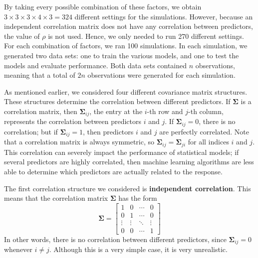 \documentclass{article}
\begin{document}
By taking every possible combination of these factors, we obtain $3\times 3\times 3\times 4\times 3 = 324$ different settings for the simulations. However, because an independent correlation matrix does not have any correlation between predictors, the value of $\rho$ is not used. Hence, we only needed to run 270 different settings. For each combination of factors, we ran 100 simulations. In each simulation, we generated two data sets: one to train the various models, and one to test the models and evaluate performance. Both data sets contained $n$ observations, meaning that a total of $2n$ observations were generated for each simulation.

As mentioned earlier, we considered four different covariance matrix structures. These structures determine the correlation between different predictors. If $\mathbf{\Sigma}$ is a correlation matrix, then $\mathbf{\Sigma}_{ij}$, the entry at the $i$-th row and $j$-th column, represents the correlation between predictors $i$ and $j$. If $\mathbf{\Sigma}_{ij}=0$, there is no correlation; but if $\mathbf{\Sigma}_{ij}=1$, then predictors $i$ and $j$ are perfectly correlated. Note that a correlation matrix is always symmetric, so $\mathbf{\Sigma}_{ij} = \mathbf{\Sigma}_{ji}$ for all indices $i$ and $j$. This correlation can severely impact the performance of statistical models; if several predictors are highly correlated, then machine learning algorithms are less able to determine which predictors are actually related to the response.

The first correlation structure we considered is \textbf{independent correlation}. This means that the correlation matrix $\mathbf{\Sigma}$ has the form
\begin{equation}
	\mathbf{\Sigma} = \begin{bmatrix}
		1 & 0 & \cdots & 0 \\
		0 & 1 & \cdots & 0 \\
		\vdots & \vdots & \ddots & \vdots \\
		0 & 0 & \cdots & 1
	\end{bmatrix}
\end{equation}
In other words, there is no correlation between different predictors, since $\mathbf{\Sigma}_{ij} = 0$ whenever $i\neq j$. Although this is a very simple case, it is very unrealistic.
\end{document}
